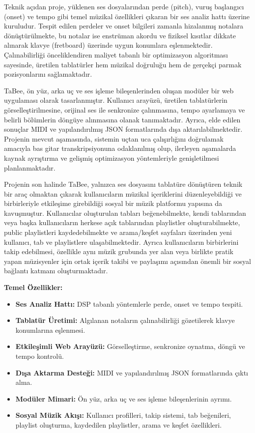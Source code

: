 \documentclass[a4paper, 12pt, titlepage]{article}
\begin{document}
Teknik açıdan proje, yüklenen ses dosyalarından perde (pitch), vuruş başlangıcı (onset) ve tempo gibi temel müzikal özellikleri çıkaran bir ses analiz hattı üzerine kuruludur. Tespit edilen perdeler ve onset bilgileri zamanla hizalanmış notalara dönüştürülmekte, bu notalar ise enstrüman akordu ve fiziksel kısıtlar dikkate alınarak klavye (fretboard) üzerinde uygun konumlara eşlenmektedir. Çalınabilirliği önceliklendiren maliyet tabanlı bir optimizasyon algoritması sayesinde, üretilen tablatürler hem müzikal doğruluğu hem de gerçekçi parmak pozisyonlarını sağlamaktadır.

TaBee, ön yüz, arka uç ve ses işleme bileşenlerinden oluşan modüler bir web uygulaması olarak tasarlanmıştır. Kullanıcı arayüzü, üretilen tablatürlerin görselleştirilmesine, orijinal ses ile senkronize çalınmasına, tempo ayarlamaya ve belirli bölümlerin döngüye alınmasına olanak tanımaktadır. Ayrıca, elde edilen sonuçlar MIDI ve yapılandırılmış JSON formatlarında dışa aktarılabilmektedir. Projenin mevcut aşamasında, sistemin uçtan uca çalışırlığını doğrulamak amacıyla bas gitar transkripsiyonuna odaklanılmış olup, ilerleyen aşamalarda kaynak ayrıştırma ve gelişmiş optimizasyon yöntemleriyle genişletilmesi planlanmaktadır.

Projenin son halinde TaBee, yalnızca ses dosyasını tablatüre dönüştüren teknik bir araç olmaktan çıkarak kullanıcıların müzikal içeriklerini düzenleyebildiği ve birbirleriyle etkileşime girebildiği sosyal bir müzik platformu yapısına da kavuşmuştur. Kullanıcılar oluşturulan tabları beğenebilmekte, kendi tablarından veya başka kullanıcıların herkese açık tablarından playlistler oluşturabilmekte, public playlistleri kaydedebilmekte ve arama/keşfet sayfaları üzerinden yeni kullanıcı, tab ve playlistlere ulaşabilmektedir. Ayrıca kullanıcıların birbirlerini takip edebilmesi, özellikle aynı müzik grubunda yer alan veya birlikte pratik yapan müzisyenler için ortak içerik takibi ve paylaşımı açısından önemli bir sosyal bağlantı katmanı oluşturmaktadır.

\textbf{Temel Özellikler:}
\begin{itemize}
    \item \textbf{Ses Analiz Hattı:} DSP tabanlı yöntemlerle perde, onset ve tempo tespiti.
    \item \textbf{Tablatür Üretimi:} Algılanan notaların çalınabilirliği gözetilerek klavye konumlarına eşlenmesi.
    \item \textbf{Etkileşimli Web Arayüzü:} Görselleştirme, senkronize oynatma, döngü ve tempo kontrolü.
    \item \textbf{Dışa Aktarma Desteği:} MIDI ve yapılandırılmış JSON formatlarında çıktı alma.
    \item \textbf{Modüler Mimari:} Ön yüz, arka uç ve ses işleme bileşenlerinin ayrımı.
    \item \textbf{Sosyal Müzik Akışı:} Kullanıcı profilleri, takip sistemi, tab beğenileri, playlist oluşturma, kaydedilen playlistler, arama ve keşfet özellikleri.
\end{itemize}
\end{document}
